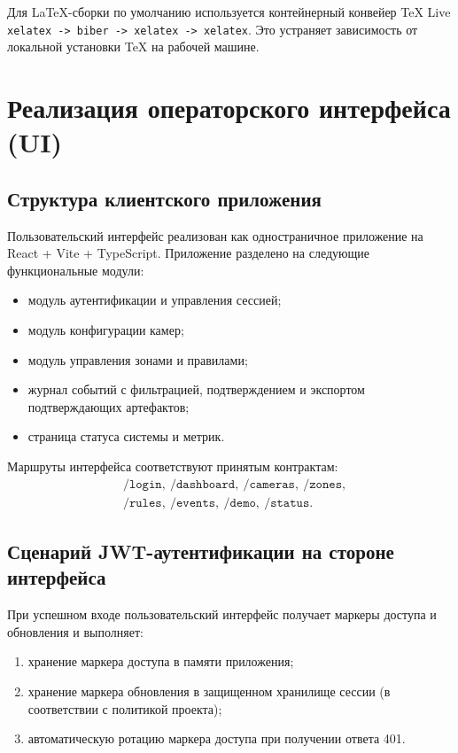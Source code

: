Для LaTeX-сборки по умолчанию используется контейнерный конвейер TeX Live \texttt{xelatex -> biber -> xelatex -> xelatex}. Это устраняет зависимость от локальной установки TeX на рабочей машине.

\section{Реализация операторского интерфейса (UI)}

\subsection{Структура клиентского приложения}

Пользовательский интерфейс реализован как одностраничное приложение на React + Vite + TypeScript. Приложение разделено на следующие функциональные модули:
\begin{itemize}
    \item модуль аутентификации и управления сессией;
    \item модуль конфигурации камер;
    \item модуль управления зонами и правилами;
    \item журнал событий с фильтрацией, подтверждением и экспортом подтверждающих артефактов;
    \item страница статуса системы и метрик.
\end{itemize}

Маршруты интерфейса соответствуют принятым контрактам:
\begin{equation}
\begin{aligned}
&\texttt{/login},\ \texttt{/dashboard},\ \texttt{/cameras},\ \texttt{/zones},\\
&\texttt{/rules},\ \texttt{/events},\ \texttt{/demo},\ \texttt{/status}.
\end{aligned}
\end{equation}
\subsection{Сценарий JWT-аутентификации на стороне интерфейса}

При успешном входе пользовательский интерфейс получает маркеры доступа и обновления и выполняет:
\begin{enumerate}
    \item хранение маркера доступа в памяти приложения;
    \item хранение маркера обновления в защищенном хранилище сессии (в соответствии с политикой проекта);
    \item автоматическую ротацию маркера доступа при получении ответа 401.
\end{enumerate}

